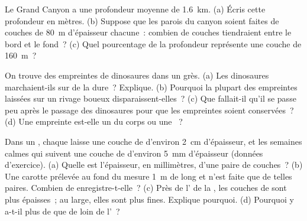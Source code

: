\begin{exercise}[$\star\star$]\label{exo:g7:sediments-and-fossils:9}
Le Grand Canyon a une profondeur moyenne de \qty{1.6}{km}. (a) Écris
cette profondeur en mètres. (b) Suppose que les parois du canyon soient
faites de couches de \qty{80}{m} d'épaisseur chacune~: combien de couches
tiendraient entre le bord et le fond~? (c) Quel pourcentage de la
profondeur représente une couche de \qty{160}{m}~?
\end{exercise}

\begin{exercise}[$\star\star$]\label{exo:g7:sediments-and-fossils:10}
On trouve des empreintes de dinosaures dans un grès. (a) Les dinosaures
marchaient-ils sur de la  dure~? Explique. (b) Pourquoi la plupart des
empreintes laissées sur un rivage boueux disparaissent-elles~? (c) Que
fallait-il qu'il se passe peu après le passage des dinosaures pour que les
empreintes soient conservées~? (d) Une empreinte est-elle un  du
corps ou une ~?
\end{exercise}

\begin{exercise}[$\star\star\star$]\label{exo:g7:sediments-and-fossils:11}
Dans un , chaque  laisse une couche de  d'environ \qty{2}{cm}
d'épaisseur, et les semaines calmes qui suivent une couche de 
d'environ \qty{5}{mm} d'épaisseur (données d'exercice). (a) Quelle est
l'épaisseur, en millimètres, d'une paire de couches~? (b) Une carotte
prélevée au fond du  mesure \qty{1}{m} de long et n'est faite que de
telles paires. Combien de  enregistre-t-elle~? (c) Près de
l' de la , les couches de  sont plus épaisses~; au
large, elles sont plus fines. Explique pourquoi. (d) Pourquoi y a-t-il plus
de  que de  loin de l'~?
\end{exercise}

